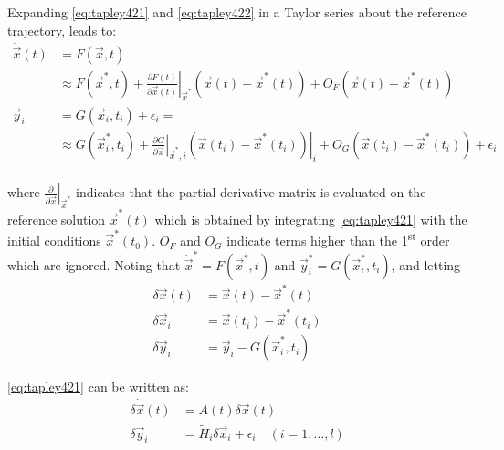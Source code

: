 Expanding \ref{eq:tapley421} and \ref{eq:tapley422} in a Taylor series about the
reference trajectory, leads to:
\begin{equation}
	\label{eq:tapley425}
	\begin{aligned}
		\dot{\vec{x}} (t) & = F (\vec{x}, t) \\
		                  & \approx F (\vec{x}^* , t)
		+ \left.\frac{\partial F(t)}{\partial \vec{x}(t)}\right|_{\vec{x}^*} \left( \vec{x}(t) - \vec{x}^* (t) \right)
		+ O_F \left( \vec{x}(t) - \vec{x}^* (t) \right) \\
		\vec{y}_i         & = G( \vec{x}_i , t_i ) + {\epsilon}_i =        \\ & \approx G( \vec{x}^*_i , t_i )
		+ \left.\frac{\partial G}{\partial \vec{x}}\right|_{\vec{x}^* , i} \left.\left( \vec{x}(t_i) - \vec{x}^* (t_i) \right)\right|_{i}
		+ O_G \left( \vec{x}(t_i) - \vec{x}^* (t_i) \right) + {\epsilon}_i \\
	\end{aligned}
\end{equation}

where \(\left.\frac{\partial}{\partial \vec{x}}\right|_{\vec{x}^*}\) indicates that
the partial derivative matrix is evaluated on the reference solution \(\vec{x}^* (t)\)
which is obtained by integrating \ref{eq:tapley421} with the initial conditions
\(\vec{x}^* (t_0)\). \(O_F\) and \(O_G\) indicate terms higher than the 1\textsuperscript{st}
order which are ignored. Noting that \(\dot{\vec{x}}^* = F(\vec{x}^* ,t)\) and
\(\vec{y}^*_i = G(\vec{x}^*_i , t_i )\), and letting
\begin{subequations}
	\begin{align}
		\delta \vec{x}(t) & = \vec{x}(t) - \vec{x}^*(t) \label{eq:tapley426ua} \\
		\delta \vec{x}_i  & = \vec{x}(t_i) - \vec{x}^*(t_i)\label{eq:tapley426ub} \\
		\delta \vec{y}_i  & = \vec{y}_i - G(\vec{x}^*_i , t_i ) \label{eq:tapley426uc}
	\end{align}
\end{subequations}

\ref{eq:tapley421} can be written as:
\begin{align}
	\label{eq:tapley426a}
	\delta \dot{\vec{x}}(t) & = A(t) \delta \vec{x}(t) \\
	\label{eq:tapley426b}
	\delta \vec{y}_i        & = \tilde{H}_i \delta \vec{x}_i + {\epsilon}_i \quad (i=1,\ldots,l)
\end{align}

